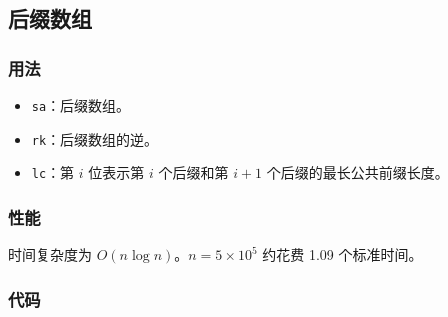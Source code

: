 \subsection{后缀数组}

\subsubsection{用法}

\begin{itemize}
\item \lstinline{sa}：后缀数组。
\item \lstinline{rk}：后缀数组的逆。
\item \lstinline{lc}：第 $i$ 位表示第 $i$ 个后缀和第 $i + 1$ 个后缀的最长公共前缀长度。
\end{itemize}

\subsubsection{性能}

时间复杂度为 $O(n \log n)$。$n = 5 \times 10^5$ 约花费 1.09 个标准时间。

\subsubsection{代码}


